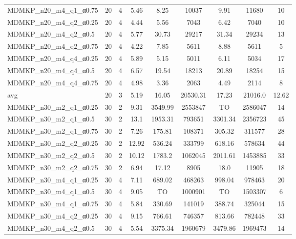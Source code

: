 \begin{table}[!ht]
{\begin{tabular}{lcccccccc}
MDMKP\_n20\_m4\_q1\_α0.75 & 20 & 4 &  \textcolor{blue2}{5.46} & 8.25 & 10037 & 9.91 & 11680 & 10 \\
MDMKP\_n20\_m4\_q2\_α0.25 & 20 & 4 &  \textcolor{blue2}{4.44} & 5.56 & 7043 & 6.42 & 7040 & 10 \\
MDMKP\_n20\_m4\_q2\_α0.5 & 20 & 4 &  \textcolor{blue2}{5.77} & 30.73 & 29217 & 31.34 & 29234 & 13 \\
MDMKP\_n20\_m4\_q2\_α0.75 & 20 & 4 &  \textcolor{blue2}{4.22} & 7.85 & 5611 & 8.88 & 5611 & 5 \\
MDMKP\_n20\_m4\_q4\_α0.25 & 20 & 4 & 5.89 &  \textcolor{blue2}{5.15} & 5011 & 6.11 & 5034 & 17 \\
MDMKP\_n20\_m4\_q4\_α0.5 & 20 & 4 &  \textcolor{blue2}{6.57} & 19.54 & 18213 & 20.89 & 18254 & 15 \\
MDMKP\_n20\_m4\_q4\_α0.75 & 20 & 4 & 4.98 &  \textcolor{blue2}{3.36} & 2063 & 4.49 & 2114 & 8 \\
\cline{1-9} avg & 20 & 3 & 5.19 & 16.05& 20530.31 & 17.23& 21016.0 & 12.62\\ \cline{1-9}
MDMKP\_n30\_m2\_q1\_α0.25 & 30 & 2 &  \textcolor{blue2}{9.31} & 3549.99 & 2553847 & TO & 2586047 & 14 \\
MDMKP\_n30\_m2\_q1\_α0.5 & 30 & 2 &  \textcolor{blue2}{13.1} & 1953.31 & 793651 & 3301.34 & 2356723 & 45 \\
MDMKP\_n30\_m2\_q1\_α0.75 & 30 & 2 &  \textcolor{blue2}{7.26} & 175.81 & 108371 & 305.32 & 311577 & 28 \\
MDMKP\_n30\_m2\_q2\_α0.25 & 30 & 2 &  \textcolor{blue2}{12.92} & 536.24 & 333799 & 618.16 & 578634 & 44 \\
MDMKP\_n30\_m2\_q2\_α0.5 & 30 & 2 &  \textcolor{blue2}{10.12} & 1783.2 & 1062045 & 2011.61 & 1453885 & 33 \\
MDMKP\_n30\_m2\_q2\_α0.75 & 30 & 2 &  \textcolor{blue2}{6.94} & 17.12 & 8905 & 18.0 & 11905 & 18 \\
MDMKP\_n30\_m4\_q1\_α0.25 & 30 & 4 &  \textcolor{blue2}{7.11} & 689.02 & 468263 & 998.04 & 978463 & 20 \\
MDMKP\_n30\_m4\_q1\_α0.5 & 30 & 4 &  \textcolor{blue2}{9.05} & TO & 1000901 & TO & 1503307 & 6 \\
MDMKP\_n30\_m4\_q1\_α0.75 & 30 & 4 &  \textcolor{blue2}{5.84} & 330.69 & 141019 & 388.74 & 325044 & 15 \\
MDMKP\_n30\_m4\_q2\_α0.25 & 30 & 4 &  \textcolor{blue2}{9.15} & 766.61 & 746357 & 813.66 & 782448 & 33 \\
MDMKP\_n30\_m4\_q2\_α0.5 & 30 & 4 &  \textcolor{blue2}{5.54} & 3375.34 & 1960679 & 3479.86 & 1969473 & 14 \\

\end{tabular}}
\end{table}
